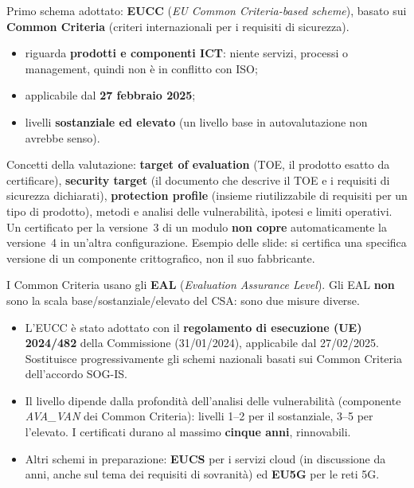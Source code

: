 Primo schema adottato: \textbf{EUCC} (\emph{EU Common Criteria-based scheme}), basato sui
\textbf{Common Criteria} (criteri internazionali per i requisiti di sicurezza).
\begin{itemize}
  \item riguarda \textbf{prodotti e componenti ICT}: niente servizi, processi o management, quindi non è
    in conflitto con ISO;
  \item applicabile dal \textbf{27 febbraio 2025};
  \item livelli \textbf{sostanziale ed elevato} (un livello base in autovalutazione non avrebbe senso).
\end{itemize}
Concetti della valutazione: \textbf{target of evaluation} (TOE, il prodotto esatto da certificare),
\textbf{security target} (il documento che descrive il TOE e i requisiti di sicurezza dichiarati),
\textbf{protection profile} (insieme riutilizzabile di requisiti per un tipo di prodotto), metodi e
analisi delle vulnerabilità, ipotesi e limiti operativi. Un certificato per la versione~3 di un modulo
\textbf{non copre} automaticamente la versione~4 in un'altra configurazione. Esempio delle slide: si
certifica una specifica versione di un componente crittografico, non il suo fabbricante.

\begin{nota}
I Common Criteria usano gli \textbf{EAL} (\emph{Evaluation Assurance Level}). Gli EAL \textbf{non} sono
la scala base/sostanziale/elevato del CSA: sono due misure diverse.
\end{nota}

\begin{integrazione}
\begin{itemize}
  \item L'EUCC è stato adottato con il \textbf{regolamento di esecuzione (UE) 2024/482} della Commissione
    (31/01/2024), applicabile dal 27/02/2025. Sostituisce progressivamente gli schemi nazionali basati
    sui Common Criteria dell'accordo SOG-IS.
  \item Il livello dipende dalla profondità dell'analisi delle vulnerabilità (componente
    \emph{AVA\_VAN} dei Common Criteria): livelli 1--2 per il sostanziale, 3--5 per l'elevato. I
    certificati durano al massimo \textbf{cinque anni}, rinnovabili.
  \item Altri schemi in preparazione: \textbf{EUCS} per i servizi cloud (in discussione da anni, anche sul
    tema dei requisiti di sovranità) ed \textbf{EU5G} per le reti 5G.
\end{itemize}
\end{integrazione}

